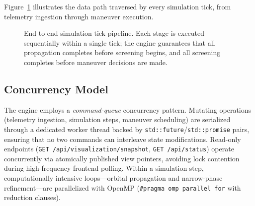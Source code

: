 \documentclass[10pt,twocolumn,letterpaper]{article}
\begin{document}
Figure~\ref{fig:pipeline} illustrates the data path traversed by every
simulation tick, from telemetry ingestion through maneuver execution.

\begin{figure}[h]
\centering
{}
\caption{End-to-end simulation tick pipeline.  Each stage is executed
  sequentially within a single tick; the engine guarantees that all
  propagation completes before screening begins, and all screening
  completes before maneuver decisions are made.}
\label{fig:pipeline}
\end{figure}

\subsection{Concurrency Model}

The engine employs a \emph{command-queue} concurrency pattern.
Mutating operations (telemetry ingestion, simulation steps, maneuver
scheduling) are serialized through a dedicated worker thread backed by
\texttt{std::future}/\texttt{std::promise} pairs, ensuring that no two
commands can interleave state modifications.  Read-only endpoints
(\texttt{GET /api/visualization/snapshot}, \texttt{GET /api/status})
operate concurrently via atomically published view pointers, avoiding
lock contention during high-frequency frontend polling.  Within a
simulation step, computationally intensive loops---orbital propagation and
narrow-phase refinement---are parallelized with OpenMP
(\texttt{\#pragma omp parallel for} with reduction clauses).
\end{document}
